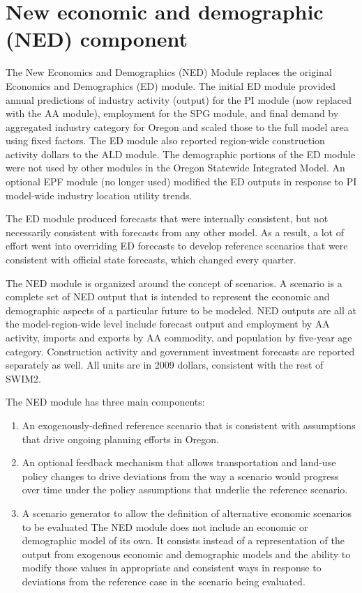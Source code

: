 \chapter{New economic and demographic (NED) component}\label{sec:ned-chapter}
The New Economics and Demographics (NED) Module replaces the original Economics and Demographics (ED) module. The initial ED module provided annual predictions of industry activity (output) for the PI module (now replaced with the AA module), employment for the SPG module, and final demand by aggregated industry category for Oregon and scaled those to the full model area using fixed factors. The ED module also reported region-wide construction activity dollars to the ALD module. The demographic portions of the ED module were not used by other modules in the Oregon Statewide Integrated Model. An optional EPF module (no longer used) modified the ED outputs in response to PI model-wide industry location utility trends.

The ED module produced forecasts that were internally consistent, but not necessarily consistent with forecasts from any other model. As a result, a lot of effort went into overriding ED forecasts to develop reference scenarios that were consistent with official state forecasts, which changed every quarter.

The NED module is organized around the concept of scenarios. A scenario is a complete set of NED output that is intended to represent the economic and demographic aspects of a particular future to be modeled. NED outputs are all at the model-region-wide level include forecast output and employment by AA activity, imports and exports by AA commodity, and population by five-year age category. Construction activity and government investment forecasts are reported separately as well. All units are in 2009 dollars, consistent with the rest of SWIM2.

The NED module has three main components:
\begin{enumerate}
\item An exogenously-defined reference scenario that is consistent with assumptions that drive ongoing planning efforts in Oregon.
\item An optional feedback mechanism that allows transportation and land-use policy changes to drive deviations from the way a scenario would progress over time under the policy assumptions that underlie the reference scenario.
\item A scenario generator to allow the definition of alternative economic scenarios to be evaluated
The NED module does not include an economic or demographic model of its own. It consists instead of a representation of the output from exogenous economic and demographic models and the ability to modify those values in appropriate and consistent ways in response to deviations from the reference case in the scenario being evaluated.
\end{enumerate}

